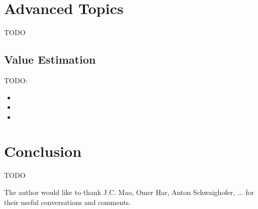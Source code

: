\documentclass[prodmode,acmtist]{acmsmall} %
\begin{document}


\section{Advanced Topics} %
\label{sec:advanced_topics}

TODO

\subsection{Value Estimation} %
\label{sub:value_estimation}

TODO:
\begin{itemize}
	\item {}
	\item {}
	\item {}
\end{itemize}	



\section{Conclusion} %
\label{sec:conclusion}

TODO


\begin{acks}
The author would like to thank J.C. Mao, Omer Har, Anton Schwaighofer, ... for their useful conversations and comments.
\end{acks}




\end{document}
